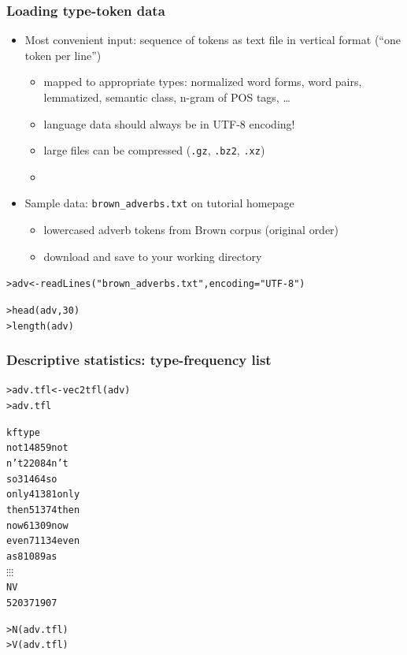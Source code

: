 \documentclass[t]{beamer} %
\begin{document}
\begin{frame}[fragile]
  \frametitle{Loading type-token data}

  \begin{itemize}
  \item Most convenient input: sequence of tokens as text file in vertical format (``one token per line'')
    \begin{itemize}
    \item[\hand] mapped to appropriate types: normalized word forms, word pairs, lemmatized, semantic class, n-gram of POS tags, \ldots
    \item[\hand] language data should always be in UTF-8 encoding!
    \item[\hand] large files can be compressed (\texttt{.gz}, \texttt{.bz2}, \texttt{.xz})
    \item[]
    \end{itemize}
  \item<2-> Sample data: \verb|brown_adverbs.txt| on tutorial homepage
    \begin{itemize}
    \item lowercased adverb tokens from Brown corpus (original order)
    \item[\hand] download and save to your working directory
    \end{itemize}
  \end{itemize}

\begin{alltt}
> adv <- readLines("brown_adverbs.txt", encoding="UTF-8")

> head(adv, 30) 
> length(adv)   
\end{alltt}
\end{frame}

\begin{frame}[fragile]
  \frametitle{Descriptive statistics: type-frequency list}

  \ungap[1]
\begin{alltt}
> adv.tfl <- vec2tfl(adv)
> adv.tfl \begin{Rout}
       k    f  type
not    1 4859   not
n't    2 2084   n't
so     3 1464    so
only   4 1381  only
then   5 1374  then
now    6 1309   now
even   7 1134  even
as     8 1089    as
       \(\vdots\)    \(\vdots\)     \(\vdots\)
     N    V
 52037 1907
\end{Rout}
> N(adv.tfl)  
> V(adv.tfl)  
\end{alltt}
\end{frame}
\end{document}
